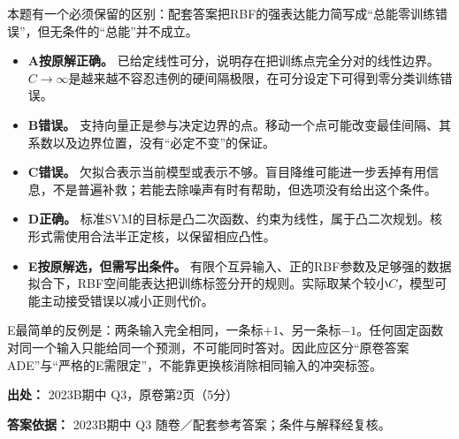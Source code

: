 本题有一个必须保留的区别：配套答案把RBF的强表达能力简写成“总能零训练错误”，但无条件的“总能”并不成立。



\begin{itemize}

\item \textbf{A按原解正确。} 已给定线性可分，说明存在把训练点完全分对的线性边界。\(C\to\infty\)是越来越不容忍违例的硬间隔极限，在可分设定下可得到零分类训练错误。

\item \textbf{B错误。} 支持向量正是参与决定边界的点。移动一个点可能改变最佳间隔、其系数以及边界位置，没有“必定不变”的保证。

\item \textbf{C错误。} 欠拟合表示当前模型或表示不够。盲目降维可能进一步丢掉有用信息，不是普遍补救；若能去除噪声有时有帮助，但选项没有给出这个条件。

\item \textbf{D正确。} 标准SVM的目标是凸二次函数、约束为线性，属于凸二次规划。核形式需使用合法半正定核，以保留相应凸性。

\item \textbf{E按原解选，但需写出条件。} 有限个互异输入、正的RBF参数及足够强的数据拟合下，RBF空间能表达把训练标签分开的规则。实际取某个较小\(C\)，模型可能主动接受错误以减小正则代价。

\end{itemize}


E最简单的反例是：两条输入完全相同，一条标\(+1\)、另一条标\(-1\)。任何固定函数对同一个输入只能给同一个预测，不可能同时答对。因此应区分“原卷答案ADE”与“严格的E需限定”，不能靠更换核消除相同输入的冲突标签。


\textbf{出处：} 2023B期中 Q3，原卷第2页（5分）


\textbf{答案依据：} 2023B期中 Q3 随卷／配套参考答案；条件与解释经复核。
